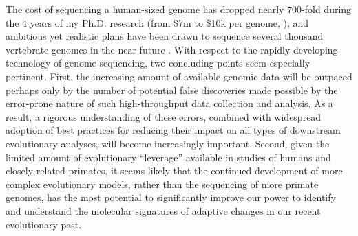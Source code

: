 The cost of sequencing a human-sized genome has dropped nearly
700-fold during the 4 years of my Ph.D. research (from \$7m to \$10k
per genome, \citep{Wetterstrand2011}), and ambitious yet realistic
plans have been drawn to sequence several thousand vertebrate genomes
in the near future \citep{Haussler2009}. With respect to the
rapidly-developing technology of genome sequencing, two concluding
points seem especially pertinent. First, the increasing amount of
available genomic data will be outpaced perhaps only by the number of
potential false discoveries made possible by the error-prone nature of
such high-throughput data collection and analysis. As a result, a
rigorous understanding of these errors, combined with widespread
adoption of best practices for reducing their impact on all types of
downstream evolutionary analyses, will become increasingly
important. Second, given the limited amount of evolutionary
``leverage'' available in studies of humans and closely-related
primates, it seems likely that the continued development of more
complex evolutionary models, rather than the sequencing of more
primate genomes, has the most potential to significantly improve our
power to identify and understand the molecular signatures of adaptive
changes in our recent evolutionary past.
